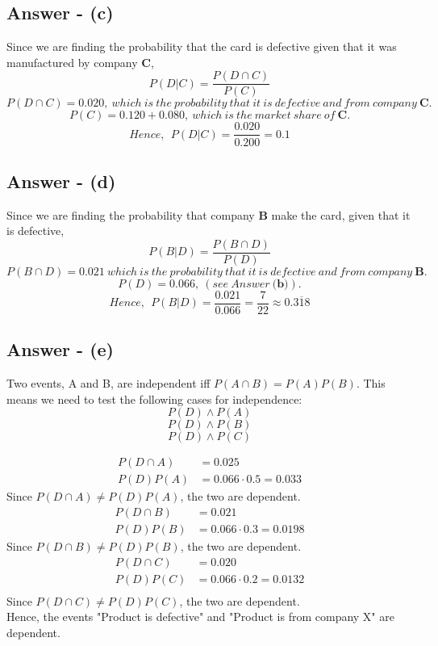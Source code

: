 \documentclass{article}
\newcommand\ddfrac[2]{\frac{\displaystyle #1}{\displaystyle #2}}
\begin{document}
\subsection{Answer - (c)}
Since we are finding the probability that the card is defective given that it was manufactured by company \textbf{C}, \\
$$P(D|C) = \ddfrac{P(D\cap C)}{P(C)}$$
$$P(D\cap C) = 0.020,\ which\ is\ the\ probability\ that\ it\ is\ defective\ and\ from\ company\ \textbf{C}.$$
$$P(C) = 0.120 + 0.080,\ which\ is\ the\ market\ share\ of\ \textbf{C}.$$
$$Hence,\ \ P(D|C) = \ddfrac{0.020}{0.200} = 0.1$$

\newpage
\subsection{Answer - (d)}
Since we are finding the probability that company \textbf{B} make the card, given that it is defective, \\
$$P(B|D) = \ddfrac{P(B\cap D)}{P(D)}$$
$$P(B\cap D) = 0.021\ which\ is\ the\ probability\ that\ it\ is\ defective\ and\ from\ company\ \textbf{B}.$$
$$P(D) = 0.066,\ (see\ Answer\ \textbf{(b)}).$$
$$Hence,\ \ P(B|D) = \ddfrac{0.021}{0.066} = \ddfrac{7}{22} \approx 0.\overline{318} $$

\subsection{Answer - (e)}
Two events, A and B, are independent iff $P(A\cap B) = P(A)P(B)$.
This means we need to test the following cases for independence:
$$P(D) \land P(A)$$
$$P(D) \land P(B)$$
$$P(D) \land P(C)$$

\begin{align*}
P(D\cap A) &= 0.025 \\
P(D)P(A) &= 0.066 \cdot 0.5 = 0.033
\end{align*}
Since $P(D\cap A) \neq P(D)P(A)$, the two are dependent.
\\

\begin{align*}
P(D\cap B) &= 0.021 \\
P(D)P(B) &= 0.066 \cdot 0.3 = 0.0198
\end{align*}
Since $P(D\cap B) \neq P(D)P(B)$, the two are dependent.
\\

\begin{align*}
P(D\cap C) &= 0.020 \\
P(D)P(C) &= 0.066 \cdot 0.2 = 0.0132 \\ 
\end{align*}
Since $P(D\cap C) \neq P(D)P(C)$, the two are dependent.
\\

Hence, the events "Product is defective" and "Product is from company X" are dependent.
 
\end{document}
